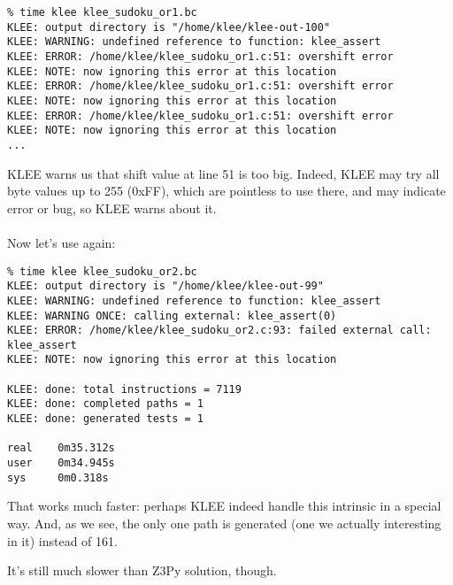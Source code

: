 \begin{lstlisting}
% time klee klee_sudoku_or1.bc
KLEE: output directory is "/home/klee/klee-out-100"
KLEE: WARNING: undefined reference to function: klee_assert
KLEE: ERROR: /home/klee/klee_sudoku_or1.c:51: overshift error
KLEE: NOTE: now ignoring this error at this location
KLEE: ERROR: /home/klee/klee_sudoku_or1.c:51: overshift error
KLEE: NOTE: now ignoring this error at this location
KLEE: ERROR: /home/klee/klee_sudoku_or1.c:51: overshift error
KLEE: NOTE: now ignoring this error at this location
...
\end{lstlisting}

KLEE warns us that shift value at line 51 is too big.
Indeed, KLEE may try all byte values up to 255 (0xFF), which are pointless to use there, and may indicate error or bug, so KLEE warns about it.\\
\\
Now let's use  again:



\begin{lstlisting}
% time klee klee_sudoku_or2.bc
KLEE: output directory is "/home/klee/klee-out-99"
KLEE: WARNING: undefined reference to function: klee_assert
KLEE: WARNING ONCE: calling external: klee_assert(0)
KLEE: ERROR: /home/klee/klee_sudoku_or2.c:93: failed external call: klee_assert
KLEE: NOTE: now ignoring this error at this location

KLEE: done: total instructions = 7119
KLEE: done: completed paths = 1
KLEE: done: generated tests = 1

real    0m35.312s
user    0m34.945s
sys     0m0.318s
\end{lstlisting}

That works much faster: perhaps KLEE indeed handle this intrinsic in a special way.
And, as we see, the only one path is generated (one we actually interesting in it) instead of 161.

It's still much slower than Z3Py solution, though.

